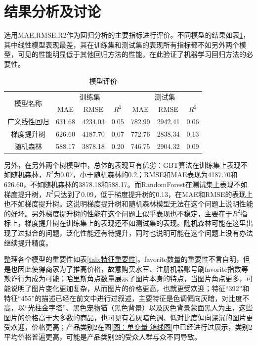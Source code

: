 \documentclass{article}
\begin{document}
\section{结果分析及讨论}
选用MAE,RMSE,R2作为回归分析的主要指标进行评价。不同模型的结果如表\ref{tab:模型评价}，其中线性模型表现最差，其在训练集和测试集的表现所有指标都不如另外两个模型，可见的性能明显低于其他回归方法的性能，在此验证了机器学习回归方法的必要性。
\begin{table}[!h]
	\centering
	\begin{tabular}{|c|ccc|ccc|}
		\hline
		\multirow{2}{*}{模型名称} &  \multicolumn{3}{c|}{训练集}       &  \multicolumn{3}{c|}{测试集}  \\
		\cline{2-7}
		&      MAE  &  RMSE     &    $R^2$   &   MAE     &   RMSE    &  $R^2$\\ 
		\hline 
		广义线性回归 & 631.68 & 4234.03 & 0.05 & 782.99 & 2942.41 & 0.06 \\	  \hline 
		梯度提升树& 626.60 & 4187.70 & 0.07 & 772.76 & 2838.34 & 0.13  \\	 \hline 
		随机森林 & 588.17 & 3878.18 & 0.20 & 746.75 & 2904.32 & 0.09 \\	 \hline  
	\end{tabular}
	\caption{模型评价}
	\label{tab:模型评价}
\end{table}
\par 另外，在另外两个树模型中，总体的表现互有优劣：GBT算法在训练集上表现不如随机森林，$R^2$为0.07，小于随机森林的0.2；RMSE和MAE表现为4187.70和626.60，不如随机森林的3878.18和588.17。而RandomForest在测试集上表现不如梯度提升树，$R^2$只达到了0.09，低于梯度提升树的0.13，在MAE和RMSE的表现上也不如梯度提升树。这说明梯度提升树和随机森林模型无法在这个问题上说明性能的好坏。另外梯度提升树的性能在这个问题上似乎表现也不稳定，主要在于$R^2$指标上，梯度提升树在训练集上的表现还不如测试集的表现。随机森林可能在这里出现了过拟合的问题，泛化性能还有待提升，同时也说明可能在这个问题上没有办法继续提升精度。
\par 整理各个模型的重要性如表\ref{tab:特征重要性}。favorite数量的重要性不言自明，但是也因此使得商家为了推高价格，故意购买水军、注册机器账号刷favorite指数等欺诈行为成为可能；哈里斯角点数量展示了图片本身的特点，当图片角点更多，可能说明了图片变化更加复杂，从而图片的价格更高，也就更受欢迎；特征“392”和特征“455”的描述已经在前文中进行过叙述，主要特征是色调偏向灰暗，对比度不高，以“光柱金字塔”、黑色宠物猫（黑色背景）以及灰色背景蒙面黑人为主，这些图片的价格高于大多数的商品，也可见有着灰暗色调、低对比度偏向深沉的图片更受欢迎，价格更高；产品类别2在图\ref{图：单变量-箱线图}中已经进行过展示，类别2平均价格普遍更高，可能是产品类别2的受众人群与众不同导致。
\end{document}
